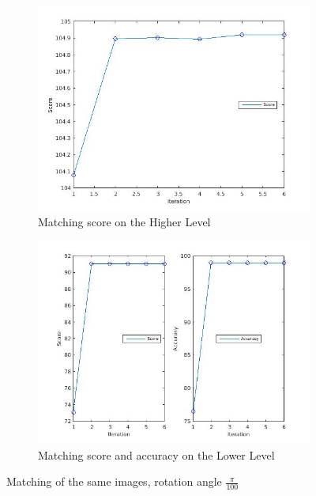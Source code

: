 \documentclass[
	fontsize=12pt,
	paper=a4,
	twoside=false,
	numbers=noenddot,
	plainheadsepline,
	toc=listof,
	toc=bibliography
]{scrartcl}
\begin{document}
\begin{figure}[ht]
	\begin{subfigure}[b]{0.5\textwidth}
		\centering
		\includegraphics[scale=0.25]{fig/method2/test_imagetrafo1/score_HL.jpg} 
		\caption{Matching score on the Higher Level} 
	\end{subfigure}%
	\begin{subfigure}[b]{0.5\textwidth}
		\centering
		\includegraphics[scale=0.25]{fig/method2/test_imagetrafo1/accuracy_LL.jpg} 
		\caption{Matching score and accuracy on the Lower Level} 
	\end{subfigure} 
	\caption{Matching of the same images, rotation angle $\frac{\pi}{100}$}
\end{figure}
\FloatBarrier
\end{document}
